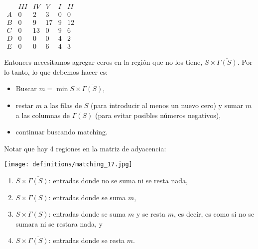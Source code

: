 \documentclass[10pt,a4paper]{article}
\begin{document}
\begin{center}
$\begin{array}{cccc|cc} & III & IV & V& I & II \\ A & 0 & 2 & 3& \boxed{0} & 0 \\ \hline B & \boxed{0} & 9 & 17 & 9 & 12 \\ C & 0 & 13 & \boxed{0}& 9 & 6 \\ D & 0 & \boxed{0} & 0& 4 & 2 \\ E & 0 & 0 & 6& 4 & 3 \end{array}$
\end{center}

Entonces necesitamos agregar ceros en la región que no los tiene, $S \times \overline{\Gamma(S)}$. Por lo tanto, lo que debemos hacer es:

\begin{itemize}

	\item Buscar $m = \min{S \times \overline{\Gamma (S)}}$,
	\item restar $m $ a las filas de $S$ (para introducir al menos un nuevo cero) y sumar $m$ a las columnas de $\Gamma(S)$ (para evitar posibles números negativos),
	\item continuar buscando matching.
\end{itemize}

Notar que hay 4 regiones en la matriz de adyacencia:

\begin{center}

    \begin{adjustbox}{max size={\textwidth}{\textheight}}
        \texttt{[image: definitions/matching\_17.jpg]}
        \end{adjustbox}
    
\end{center}

\begin{enumerate}

	\item $\overline{S}\times \overline{\Gamma(S)}$: entradas donde no se suma ni se resta nada,
	\item $\overline{S} \times \Gamma(S)$: entradas donde se suma $m$,
	\item $S \times \Gamma(S)$: entradas donde se suma $m$ y se resta $m$, es decir, es como si no se sumara ni se restara nada, y
	\item $S \times \overline{\Gamma(S)}$: entradas donde se resta $m$.
\end{enumerate}
\end{document}
